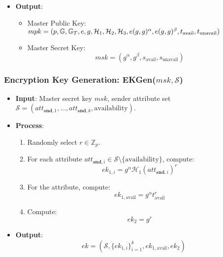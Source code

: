 \documentclass[runningheads]{llncs}
\begin{document}
\begin{itemize}
\begin{enumerate}
    \end{enumerate}
    \item \textbf{Output}:
    \begin{itemize}
        \item Master Public Key:
        $
        mpk = (p, \mathbb{G}, \mathbb{G}_T, e, g, \mathcal{H}_1, \mathcal{H}_2,\\ \mathcal{H}_3, e(g,g)^\alpha, e(g,g)^\beta, t_{\text{avail}}, t_{\text{unavail}})
        $
        \item Master Secret Key:
        \[
        msk = (g^\alpha, g^\beta, s_{\text{avail}}, s_{\text{unavail}})
        \]
    \end{itemize}
\end{itemize}

\subsubsection{Encryption Key Generation: EKGen($msk, \mathcal{S}$)}
\begin{itemize}
    \item \textbf{Input}: Master secret key $msk$, sender attribute set $\mathcal{S} = (att_{\mathbf{snd},1}, \ldots, att_{\mathbf{snd},k}, \text{availability})$.
    \item \textbf{Process}:
    \begin{enumerate}
        \item Randomly select $r \in \mathbb{Z}_p$.
        \item For each attribute $att_{\mathbf{snd},i} \in \mathcal{S} \setminus \{\text{availability}\}$, compute:
        \[
        ek_{1,i} = g^\alpha \mathcal{H}_1(att_{\mathbf{snd},i})^r
        \]
        \item For the  attribute, compute:
        \[
        ek_{1,\text{avail}} = g^\alpha t_{\text{avail}}^r
        \]
        \item Compute:
        \[
        ek_2 = g^r
        \]
    \end{enumerate}
    \item \textbf{Output}:
    \[
    ek = (\mathcal{S}, \{ek_{1,i}\}_{i=1}^k, ek_{1,\text{avail}}, ek_2)
    \]
\end{itemize}
\end{document}
